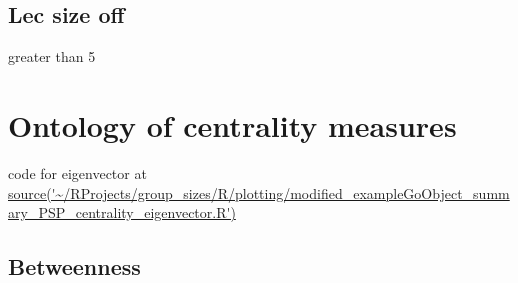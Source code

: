 \subsection{Lec size off}

greater than 5

\section{Ontology of centrality measures}
code for eigenvector at \url{source('~/RProjects/group_sizes/R/plotting/modified_exampleGoObject_summary_PSP_centrality_eigenvector.R')}
\subsection{Betweenness}
